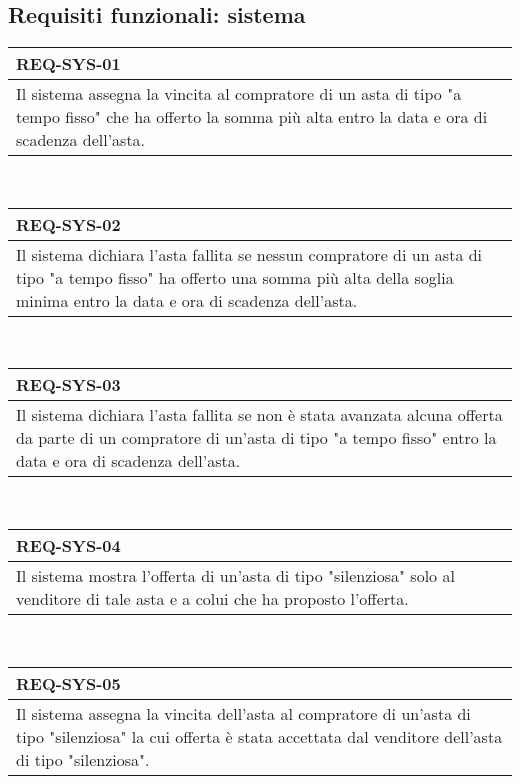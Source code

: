         \subsection{Requisiti funzionali: sistema}
        \begin{tabular}{|p{}|}
            \hline
            \multicolumn{1}{|l|}{\cellcolor{head}\textbf{REQ-SYS-01}} \\
            \hline
            Il sistema assegna la vincita al compratore di un asta di tipo "a tempo fisso" che ha offerto la somma più alta entro la data e ora di scadenza dell'asta. \\
            \hline
        \end{tabular} \smallskip \\
        \begin{tabular}{|p{}|}
            \hline
            \multicolumn{1}{|l|}{\cellcolor{head}\textbf{REQ-SYS-02}} \\
            \hline
            Il sistema dichiara l'asta fallita se nessun compratore di un asta di tipo "a tempo fisso" ha offerto una somma più alta della soglia minima entro la data e ora di scadenza dell'asta. \\
            \hline
        \end{tabular} \smallskip \\
        \begin{tabular}{|p{}|}
            \hline
            \multicolumn{1}{|l|}{\cellcolor{head}\textbf{REQ-SYS-03}} \\
            \hline
            Il sistema dichiara l'asta fallita se non è stata avanzata alcuna offerta da parte di un compratore di un'asta di tipo "a tempo fisso" entro la data e ora di scadenza dell'asta. \\
            \hline
        \end{tabular} \smallskip \\
        \begin{tabular}{|p{}|}
            \hline
            \multicolumn{1}{|l|}{\cellcolor{head}\textbf{REQ-SYS-04}} \\
            \hline
            Il sistema mostra l'offerta di un'asta di tipo "silenziosa" solo al venditore di tale asta e a colui che ha proposto l'offerta. \\
            \hline
        \end{tabular} \smallskip \\
        \begin{tabular}{|p{}|}
            \hline
            \multicolumn{1}{|l|}{\cellcolor{head}\textbf{REQ-SYS-05}} \\
            \hline
            Il sistema assegna la vincita dell'asta al compratore di un'asta di tipo "silenziosa" la cui offerta è stata accettata dal venditore dell'asta di tipo "silenziosa". \\
            \hline
        \end{tabular} \smallskip \\
